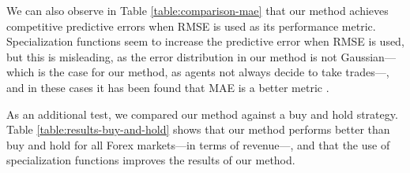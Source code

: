 \documentclass{ieeeaccess}
\begin{document}
We can also observe in Table \ref{table:comparison-mae} that our
method achieves competitive predictive errors when RMSE is used as its
performance metric. Specialization functions seem to increase the
predictive error when RMSE is used, but this is misleading, as the
error distribution in our method is not Gaussian---which is the case
for our method, as agents not always decide to take trades---, and in
these cases it has been found that MAE is a better metric
\cite{chai2014root} \cite{willmott2005advantages}
\cite{willmott2009ambiguities}.

As an additional test, we compared our method against a buy and hold
strategy. Table \ref{table:results-buy-and-hold} shows that our method
performs better than buy and hold for all Forex markets---in terms of
revenue---, and that the use of specialization functions improves the
results of our method.







\end{document}

